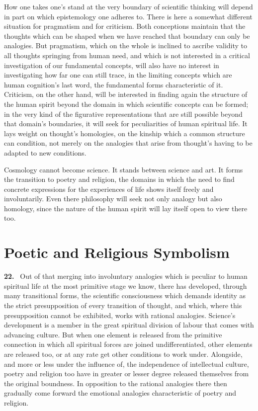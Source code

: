 \documentclass[12pt]{book}
\newcommand{\hnum}[1]{\noindent\textbf{#1.}~}
\newcommand{\opage}[1]{\marginnote{\footnotesize\textit{[#1]}}}
\begin{document}
\opage{128}How one takes one's stand at the very boundary of scientific thinking will depend
in part on which epistemology one adheres to. There is here a somewhat different
situation for pragmatism and for criticism. Both conceptions maintain that the
thoughts which can be shaped when we have reached that boundary can only be
analogies. But pragmatism, which on the whole is inclined to ascribe validity to
all thoughts springing from human need, and which is not interested in a critical
investigation of our fundamental concepts, will also have no interest in
investigating how far one can still trace, in the limiting concepts which are
human cognition's last word, the fundamental forms characteristic of it. Criticism,
on the other hand, will be interested in finding again the structure of the human
spirit beyond the domain in which scientific concepts can be formed; in the very
kind of the figurative representations that are still possible beyond that
domain's boundaries, it will seek for peculiarities of human spiritual life. It
lays weight on thought's homologies, on the kinship which a common structure can
condition, not merely on the analogies that arise from thought's having to be
adapted to new conditions.

Cosmology cannot become science. It stands between science and art. It forms the
transition to poetry and religion, the domains in which the need to find concrete
expressions for the experiences of life shows itself freely and involuntarily.
Even there philosophy will seek not only analogy but also homology, since the
nature of the human spirit will lay itself open to view there too.



\chapter{Poetic and Religious Symbolism}
\label{ch:5}

\hnum{22} \opage{129}Out of that merging into involuntary analogies which is peculiar to
human spiritual life at the most primitive stage we know, there has developed,
through many transitional forms, the scientific consciousness which demands
identity as the strict presupposition of every transition of thought, and which,
where this presupposition cannot be exhibited, works with rational analogies.
Science's development is a member in the great spiritual division of labour that
comes with advancing culture. But when one element is released from the primitive
connection in which all spiritual forces are joined undifferentiated, other
elements are released too, or at any rate get other conditions to work under.
Alongside, and more or less under the influence of, the independence of
intellectual culture, poetry and religion too have in greater or lesser degree
released themselves from the original boundness. In opposition to the rational
analogies there then gradually come forward the emotional analogies characteristic
of poetry and religion.
\end{document}
